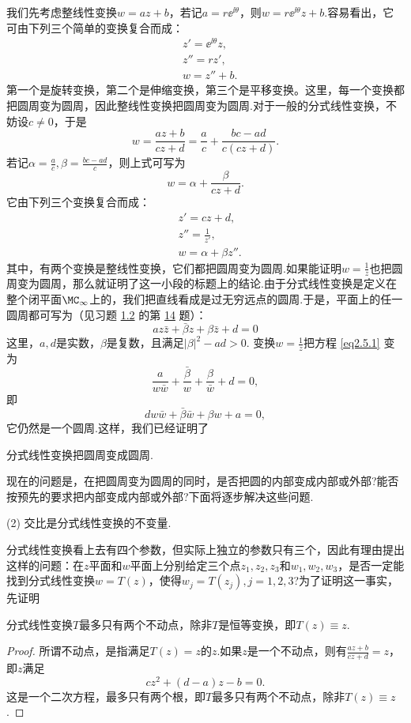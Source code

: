 我们先考虑整线性变换$w=az+b$，若记$a=r\ee^{\ii\theta}$，则$w=r\ee^{\ii\theta}z+b$.容易看出，它可由下列三个简单的变换复合而成：
\begin{align*}
  &z'=\ee^{\ii\theta}z,\\
  &z''=rz',\\
  &w=z''+b.
\end{align*}
第一个是旋转变换，第二个是伸缩变换，第三个是平移变换。这里，每一个变换都把圆周变为圆周，因此整线性变换把圆周变为圆周.对于一般的分式线性变换，不妨设$c\ne0$，于是
\[w=\frac{az+b}{cz+d}=\frac ac+\frac{bc-ad}{c(cz+d)}.\]
若记$\alpha=\frac ac,\beta=\frac{bc-ad}c$，则上式可写为
\[w=\alpha+\frac{\beta}{cz+d}.\]
它由下列三个变换复合而成：
\begin{align*}
  &z'=cz+d,\\
  &z''=\frac1{z'},\\
  &w=\alpha+\beta z''.
\end{align*}
其中，有两个变换是整线性变换，它们都把圆周变为圆周.如果能证明$w=\frac 1z$也把圆周变为圆周，那么就证明了这一小段的标题上的结论.由于分式线性变换是定义在整个闭平面$\MC_\infty$上的，我们把直线看成是过无穷远点的圆周.于是，平面上的任一圆周都可写为（见习题 \hyperlink{xiti1.2}{1.2} 的第 \hyperlink{xiti1.2.14}{14} 题）：
\begin{equation}\label{eq2.5.1}
az\bar z+\bar \beta z+\beta \bar z+d=0
\end{equation}
这里，$a,d$是实数，$\beta$是复数，且满足$|\beta|^2-ad>0$. 变换$w=\frac1z$把方程 \eqref{eq2.5.1} 变为
\[\frac a{w\bar w}+\frac{\bar \beta}w+\frac{\beta}{\bar w}+d=0,\]
即
\[dw\bar w+\bar\beta \bar w+\beta w+a=0,\]
它仍然是一个圆周.这样，我们已经证明了
\begin{theorem}\label{thm2.5.1}
  分式线性变换把圆周变成圆周.
\end{theorem}

现在的问题是，在把圆周变为圆周的同时，是否把圆的内部变成内部或外部?能否按预先的要求把内部变成内部或外部?下面将逐步解决这些问题.

(2) {\kaishu 交比是分式线性变换的不变量.}

分式线性变换看上去有四个参数，但实际上独立的参数只有三个，因此有理由提出这样的问题：在$z$平面和$w$平面上分别给定三个点$z_1,z_2,z_3$和$w_1,w_2,w_3$，是否一定能找到分式线性变换$w=T(z)$，使得$w_j=T(z_j),j=1,2,3$?为了证明这一事实，先证明
\begin{prop}\label{prop2.5.2}
分式线性变换$T$最多只有两个不动点，除非$T$是恒等变换，即$T(z)\equiv z$.
\end{prop}
\begin{proof}
  所谓不动点，是指满足$T(z)=z$的$z$.如果$z$是一个不动点，则有$\frac{az+b}{cz+d}=z$，即$z$满足
\[cz^2+(d-a)z-b=0.\]
这是一个二次方程，最多只有两个根，即$T$最多只有两个不动点，除非$T(z)\equiv z$.
\end{proof}

